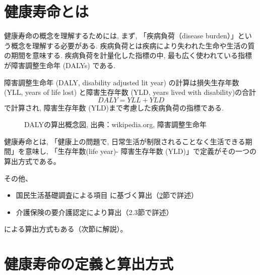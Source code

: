 \section{健康寿命とは}


健康寿命の概念を理解するためには, まず, 「疾病負荷（disease burden）」という概念を理解する必要がある. 疾病負荷とは疾病により失われた生命や生活の質の期間を意味する.
疾病負荷を計量化した指標の中,
最も広く使われている指標が障害調整生命年 (DALYs) である.

障害調整生命年 (DALY, disability adjusted lit year) の計算は損失生存年数 (YLL, years of life lost) と障害生存年数 (YLD, years lived with disability)の合計
	\begin{equation}
	\label{daly}
	DALY=YLL+YLD
	\end{equation}
	で計算され, 障害生存年数 (YLD)まで考慮した疾病負荷の指標である.



\begin{figure}[h!]
	\begin{center}
			\caption{DALYの算出概念図, 出典：wikipedia.org, 障害調整生命年
		}
	\end{center}
\end{figure}

健康寿命とは, 「健康上の問題で, 日常生活が制限されることなく生活できる期間」を意味し, 「生存年数(life year)- 障害生存年数 (YLD)」で定義がその一つの算出方式である。

その他、

\begin{itemize}
\item 国民生活基礎調査による項目  に基づく算出（\ref{survey}節で詳述）
\item 介護保険の要介護認定により算出（2.3節で詳述）
\end{itemize}
による算出方式もある（次節に解説）。



\section{健康寿命の定義と算出方式}
\label{survey}
%

